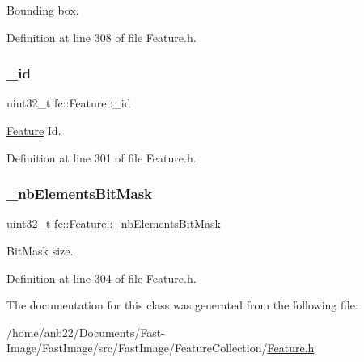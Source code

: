 Bounding box. 



Definition at line 308 of file Feature.\+h.

\mbox{\label{classfc_1_1Feature_aa212a88fec6bc5973c655069d64825fd}} 
\subsubsection{\texorpdfstring{\+\_\+id}{\_id}}
{\footnotesize\ttfamily uint32\+\_\+t fc\+::\+Feature\+::\+\_\+id\hspace{0.3cm}{\ttfamily [private]}}



\hyperlink{classfc_1_1Feature}{Feature} Id. 



Definition at line 301 of file Feature.\+h.

\mbox{\label{classfc_1_1Feature_abf72f4385cf0552270cc99df0dd6ecdd}} 
\subsubsection{\texorpdfstring{\+\_\+nb\+Elements\+Bit\+Mask}{\_nbElementsBitMask}}
{\footnotesize\ttfamily uint32\+\_\+t fc\+::\+Feature\+::\+\_\+nb\+Elements\+Bit\+Mask\hspace{0.3cm}{\ttfamily [private]}}



Bit\+Mask size. 



Definition at line 304 of file Feature.\+h.



The documentation for this class was generated from the following file\+:\begin{DoxyCompactItemize}
\item 
/home/anb22/\+Documents/\+Fast-\/\+Image/\+Fast\+Image/src/\+Fast\+Image/\+Feature\+Collection/\hyperlink{Feature_8h}{Feature.\+h}\end{DoxyCompactItemize}
